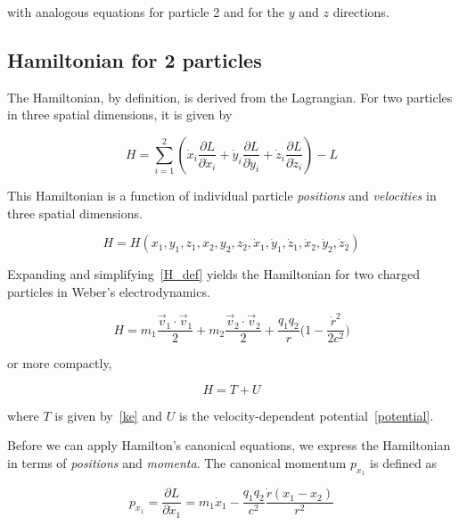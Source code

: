 \documentclass[12pt,a4paper]{article}
\theoremstyle{definition}
\theoremstyle{remark}
\newcommand{\qq}{q_1 q_2}
\newcommand{\rdot}{\dot{r}}
\begin{document}
with analogous equations for particle 2 and for the $y$ and $z$ directions.

\subsection{Hamiltonian for 2 particles}
The Hamiltonian, by definition, is derived from the Lagrangian. For two particles in three spatial dimensions, it is given by

\begin{equation}\label{H_def}
    H = \sum_{i=1}^{2} \left(\dot{x}_i \frac{\partial L}{\partial \dot{x}_i} + \dot{y}_i \frac{\partial L}{\partial \dot{y}_i} + \dot{z}_i \frac{\partial L}{\partial \dot{z}_i}\right) - L
\end{equation}

This Hamiltonian is a function of individual particle \textit{positions} and \textit{velocities} in three spatial dimensions.

\begin{equation}
    H = H(x_1, y_1, z_1, x_2, y_2, z_2, \dot{x}_1, \dot{y}_1, \dot{z}_1, \dot{x}_2, \dot{y}_2, \dot{z}_2)
\end{equation}

Expanding and simplifying~\eqref{H_def} yields the Hamiltonian for two charged particles in Weber's electrodynamics.

\begin{equation}\label{H}
    H = m_1 \frac{\vec{v}_1 \cdot \vec{v}_1}{2} + m_2 \frac{\vec{v}_2 \cdot \vec{v}_2}{2} + \frac{\qq}{r}\bigg(1 - \frac{\rdot^2}{2c^2}\bigg)
\end{equation}

or more compactly,

\begin{equation}\label{h_box}
    \boxed{H = T + U}
\end{equation}

where $T$ is given by~\eqref{ke} and $U$ is the velocity-dependent potential~\eqref{potential}.

Before we can apply Hamilton's canonical equations, we express the Hamiltonian in terms of \textit{positions} and \textit{momenta}. The canonical momentum $p_{x_1}$ is defined as

\begin{equation}\label{px1}
    p_{x_1} = \frac{\partial L}{\partial \dot{x}_1} = m_1 \dot{x}_1 - \frac{q_1 q_2}{c^2} \frac{\rdot (x_1 - x_2)}{r^2}
\end{equation}
\end{document}
